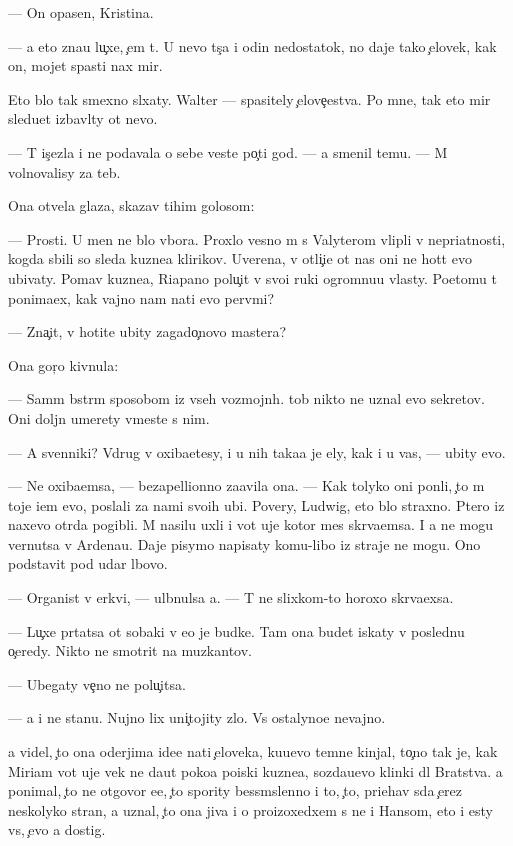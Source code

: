 \documentclass[10pt]{book}
\begin{document}
— On opasen, Kristina.

— {\Y}a eto zna{\y}u lu{\c}xe, {\c}em t{\yi}. U nevo t{\yi}s{\ia}{\c}a i odin nedostatok, no daje tako{\y} {\c}elovek, kak on, mojet spasti nax mir.

Eto b{\yi}lo tak smexno sl{\yi}xaty. Walter — spasitely {\c}elove{\c}estva. Po mne, tak eto mir sledu{\y}et izbavl{\ia}ty ot nevo.

— T{\yi} is{\c}ezla i ne podavala o sebe veste{\y} po{\c}ti god. — {\Y}a smenil temu. — M{\yi} volnovalisy za teb{\ia}.

Ona otvela glaza, skazav tihim golosom:

— Prosti. U men{\ia} ne b{\yi}lo v{\yi}bora. Proxlo{\y} vesno{\y} m{\yi} s Valyterom vlipli v nepri{\y}atnosti, kogda sbili so sleda kuzne{\q}a klirikov. Uverena, v otli{\c}i{\y}e ot nas oni ne hot{\ia}t {\y}evo ubivaty. Po{\y}mav kuzne{\q}a, Riapano polu{\c}it v svo{\y}i ruki ogromnu{\y}u vlasty. Poetomu t{\yi} ponima{\y}ex, kak vajno nam na{\y}ti {\y}evo perv{\yi}mi?

— Zna{\c}it, v{\yi} hotite ubity zagado{\c}novo mastera?

Ona gor{\ia}{\c}o kivnula:

— Sam{\yi}m b{\yi}str{\yi}m sposobom iz vseh vozmojn{\yi}h. {\C}tob{\yi} nikto ne uznal {\y}evo sekretov. Oni doljn{\yi} umerety vmeste s nim.

— A sv{\ia}{\x}enniki? Vdrug v{\yi} oxiba{\y}etesy, i u nih taka{\y}a je {\q}ely, kak i u vas, — ubity {\y}evo.

— Ne oxiba{\y}emsa, — bezapell{\ia}{\q}ionno za{\y}avila ona. — Kak tolyko oni pon{\ia}li, {\c}to m{\yi} toje i{\x}em {\y}evo, poslali za nami svo{\y}ih ubi{\y}{\q}. Povery, Ludwig, eto b{\yi}lo straxno. P{\ia}tero iz naxevo otr{\ia}da pogibli. M{\yi} nasilu uxli i vot uje kotor{\yi}{\y} mes{\ia}{\q} skr{\yi}va{\y}emsa. I {\y}a ne mogu vernutsa v Ardenau. Daje pisymo napisaty komu-libo iz straje{\y} ne mogu. Ono podstavit pod udar l{\iu}bovo.

— Organist v {\q}erkvi, — ul{\yi}bnulsa {\y}a. — T{\yi} ne slixkom-to horoxo skr{\yi}va{\y}exsa.

— Lu{\c}xe pr{\ia}tatsa ot sobaki v {\y}e{\y}o je budke. Tam ona budet iskaty v posledn{\iu}{\y}u o{\c}eredy. Nikto ne smotrit na muz{\yi}kantov.

— Ubegaty ve{\c}no ne polu{\c}itsa.

— {\Y}a i ne stanu. Nujno lix uni{\c}tojity zlo. Vs{\e} ostalyno{\y}e nevajno.

{\Y}a videl, {\c}to ona oderjima ide{\y}e{\y} na{\y}ti {\c}eloveka, ku{\y}u{\x}evo temn{\yi}{\y}e kinjal{\yi}, to{\c}no tak je, kak Miriam vot uje vek ne da{\y}ut poko{\y}a poiski kuzne{\q}a, sozda{\y}u{\x}evo klinki dl{\ia} Bratstva. {\Y}a ponimal, {\c}to ne otgovor{\iu} {\y}e{\y}e, {\c}to spority bessm{\yi}slenno i to, {\c}to, pri{\y}ehav s{\iu}da {\c}erez neskolyko stran, {\y}a uznal, {\c}to ona jiva i o proizoxedxem s ne{\y} i Hansom, eto i {\y}esty vs{\e}, {\c}evo {\y}a dostig.
\end{document}
